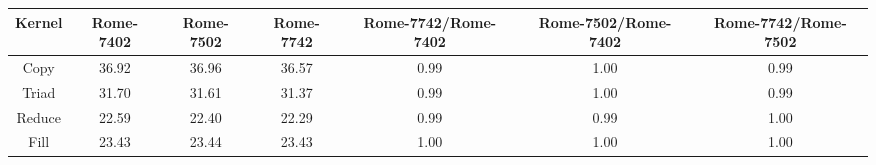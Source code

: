 \begin{tabular}{|c|c|c|c|c|c|c|}  \hline
Kernel&Rome-7402&Rome-7502&Rome-7742 & Rome-7742/Rome-7402 & Rome-7502/Rome-7402 & Rome-7742/Rome-7502 \\ \hline 
Copy & 36.92 & 36.96 & 36.57  & 0.99 & 1.00 & 0.99 \\ \hline 
Triad & 31.70 & 31.61 & 31.37  & 0.99 & 1.00 & 0.99 \\ \hline 
Reduce & 22.59 & 22.40 & 22.29  & 0.99 & 0.99 & 1.00 \\ \hline 
Fill & 23.43 & 23.44 & 23.43  & 1.00 & 1.00 & 1.00 \\ \hline 
\end{tabular}
